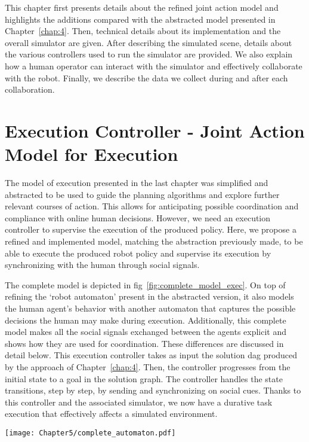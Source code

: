 This chapter first presents details about the refined joint action model and highlights the additions compared with the abstracted model presented in Chapter~\ref{chap:4}. Then, technical details about its implementation and the overall simulator are given. After describing the simulated scene, details about the various controllers used to run the simulator are provided. We also explain how a human operator can interact with the simulator and effectively collaborate with the robot. Finally, we describe the data we collect during and after each collaboration. 


\section{Execution Controller - Joint Action Model for Execution}

The model of execution presented in the last chapter was simplified and abstracted to be used to guide the planning algorithms and explore further relevant courses of action. This allows for anticipating possible coordination and compliance with online human decisions. 
However, we need an execution controller to supervise the execution of the produced policy. Here, we propose a refined and implemented model, matching the abstraction previously made, to be able to execute the produced robot policy and supervise its execution by synchronizing with the human through social signals.

The complete model is depicted in fig~\ref{fig:complete_model_exec}. On top of refining the `robot automaton' present in the abstracted version, it also models the human agent's behavior with another automaton that captures the possible decisions the human may make during execution. Additionally, this complete model makes all the social signals exchanged between the agents explicit and shows how they are used for coordination. These differences are discussed in detail below. This execution controller takes as input the solution \acrshort{dag} produced by the approach of Chapter~\ref{chap:4}. Then, the controller progresses from the initial state to a goal in the solution graph. The controller handles the state transitions, step by step, by sending and synchronizing on social cues. Thanks to this controller and the associated simulator, we now have a durative task execution that effectively affects a simulated environment.

\begin{sidewaysfigure}
    \centering
    \texttt{[image: Chapter5/complete\_automaton.pdf]}
    \caption{Complete Model of Execution - Dual Automaton. This version details the robot automaton and the assumed human automaton as well as the visual signals exchanges between the agents to synchronize themselves.}
    \label{fig:complete_model_exec}
\end{sidewaysfigure}


